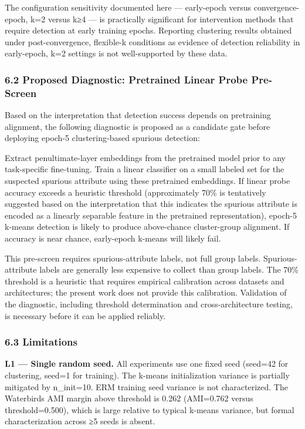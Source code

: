 The configuration sensitivity documented here — early-epoch versus convergence-epoch, k=2 versus k≥4 — is practically significant for intervention methods that require detection at early training epochs. Reporting clustering results obtained under post-convergence, flexible-k conditions as evidence of detection reliability in early-epoch, k=2 settings is not well-supported by these data.

\subsubsection{6.2 Proposed Diagnostic: Pretrained Linear Probe Pre-Screen}

Based on the interpretation that detection success depends on pretraining alignment, the following diagnostic is proposed as a candidate gate before deploying epoch-5 clustering-based spurious detection:

Extract penultimate-layer embeddings from the pretrained model prior to any task-specific fine-tuning. Train a linear classifier on a small labeled set for the suspected spurious attribute using these pretrained embeddings. If linear probe accuracy exceeds a heuristic threshold (approximately 70\% is tentatively suggested based on the interpretation that this indicates the spurious attribute is encoded as a linearly separable feature in the pretrained representation), epoch-5 k-means detection is likely to produce above-chance cluster-group alignment. If accuracy is near chance, early-epoch k-means will likely fail.

This pre-screen requires spurious-attribute labels, not full group labels. Spurious-attribute labels are generally less expensive to collect than group labels. The 70\% threshold is a heuristic that requires empirical calibration across datasets and architectures; the present work does not provide this calibration. Validation of the diagnostic, including threshold determination and cross-architecture testing, is necessary before it can be applied reliably.

\subsubsection{6.3 Limitations}

\textbf{L1 — Single random seed.} All experiments use one fixed seed (seed=42 for clustering, seed=1 for training). The k-means initialization variance is partially mitigated by n_init=10. ERM training seed variance is not characterized. The Waterbirds AMI margin above threshold is 0.262 (AMI=0.762 versus threshold=0.500), which is large relative to typical k-means variance, but formal characterization across ≥5 seeds is absent.

